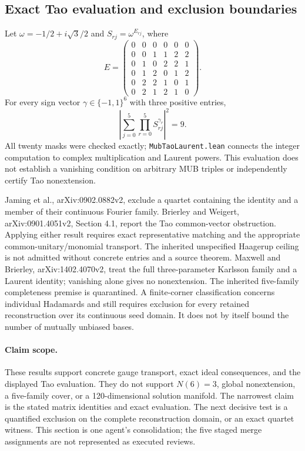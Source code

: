 \documentclass[11pt,a4paper]{article}
\theoremstyle{plain}
\theoremstyle{definition}
\begin{document}
\subsection{Exact Tao evaluation and exclusion boundaries}
Let $\omega=-1/2+i\sqrt3/2$ and $S_{rj}=\omega^{E_{rj}}$, where
\[
 E=\begin{pmatrix}
 0&0&0&0&0&0\\0&0&1&1&2&2\\0&1&0&2&2&1\\
 0&1&2&0&1&2\\0&2&2&1&0&1\\0&2&1&2&1&0
 \end{pmatrix}.
\]
For every sign vector $\gamma\in\{-1,1\}^6$ with three positive entries,
\[
 \left|\sum_{j=0}^{5}\prod_{r=0}^{5}S_{rj}^{\gamma_r}\right|^2=9.
\]
All twenty masks were checked exactly; \texttt{MubTaoLaurent.lean}
connects the integer computation to complex multiplication and Laurent
powers. This evaluation does not establish a vanishing condition on
arbitrary MUB triples or independently certify Tao nonextension.

Jaming et al., arXiv:0902.0882v2, exclude a quartet containing the identity
and a member of their continuous Fourier family. Brierley and Weigert,
arXiv:0901.4051v2, Section 4.1, report the Tao common-vector obstruction.
Applying either result requires exact representative matching and the
appropriate common-unitary/monomial transport. The inherited unspecified
Haagerup ceiling is not admitted without concrete entries and a source theorem.
Maxwell and Brierley, arXiv:1402.4070v2, treat the full three-parameter
Karlsson family and a Laurent identity; vanishing alone gives no nonextension.
The inherited five-family completeness premise is quarantined.
A finite-corner classification concerns individual Hadamards and still
requires exclusion for every retained reconstruction over its continuous
seed domain. It does not by itself bound the number of mutually unbiased bases.

\paragraph{Claim scope.}
These results support concrete gauge transport, exact ideal consequences,
and the displayed Tao evaluation. They do not support $N(6)=3$, global
nonextension, a five-family cover, or a 120-dimensional solution manifold.
The narrowest claim is the stated matrix identities and exact evaluation.
The next decisive test is a quantified exclusion on the complete reconstruction
domain, or an exact quartet witness. This section is one agent's consolidation;
the five staged merge assignments are not represented as executed reviews.
\end{document}
